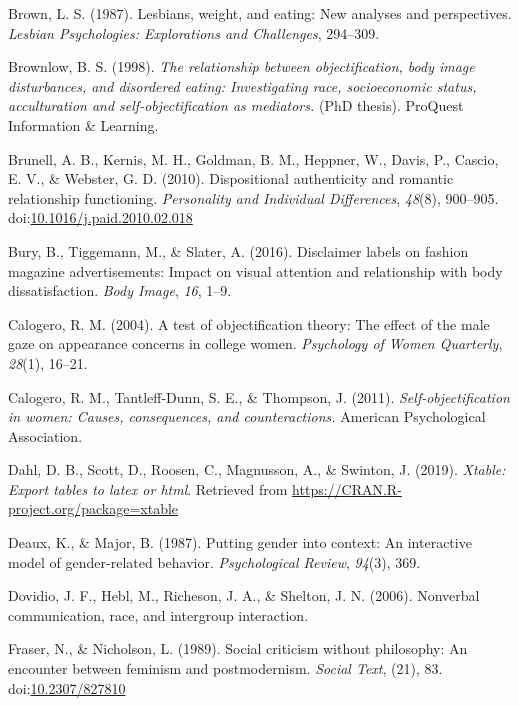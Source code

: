 \documentclass[
  man]{apa6}
\begin{document}
\leavevmode\hypertarget{ref-brown1987lesbians}{}%
Brown, L. S. (1987). Lesbians, weight, and eating: New analyses and perspectives. \emph{Lesbian Psychologies: Explorations and Challenges}, 294--309.

\leavevmode\hypertarget{ref-brownlow1998relationship}{}%
Brownlow, B. S. (1998). \emph{The relationship between objectification, body image disturbances, and disordered eating: Investigating race, socioeconomic status, acculturation and self-objectification as mediators.} (PhD thesis). ProQuest Information \& Learning.

\leavevmode\hypertarget{ref-brunelletal2010}{}%
Brunell, A. B., Kernis, M. H., Goldman, B. M., Heppner, W., Davis, P., Cascio, E. V., \& Webster, G. D. (2010). Dispositional authenticity and romantic relationship functioning. \emph{Personality and Individual Differences}, \emph{48}(8), 900--905. doi:\href{https://doi.org/10.1016/j.paid.2010.02.018}{10.1016/j.paid.2010.02.018}

\leavevmode\hypertarget{ref-bury2016}{}%
Bury, B., Tiggemann, M., \& Slater, A. (2016). Disclaimer labels on fashion magazine advertisements: Impact on visual attention and relationship with body dissatisfaction. \emph{Body Image}, \emph{16}, 1--9.

\leavevmode\hypertarget{ref-calogero2004test}{}%
Calogero, R. M. (2004). A test of objectification theory: The effect of the male gaze on appearance concerns in college women. \emph{Psychology of Women Quarterly}, \emph{28}(1), 16--21.

\leavevmode\hypertarget{ref-calogero2011}{}%
Calogero, R. M., Tantleff-Dunn, S. E., \& Thompson, J. (2011). \emph{Self-objectification in women: Causes, consequences, and counteractions.} American Psychological Association.

\leavevmode\hypertarget{ref-R-xtable}{}%
Dahl, D. B., Scott, D., Roosen, C., Magnusson, A., \& Swinton, J. (2019). \emph{Xtable: Export tables to latex or html}. Retrieved from \url{https://CRAN.R-project.org/package=xtable}

\leavevmode\hypertarget{ref-deaux1987putting}{}%
Deaux, K., \& Major, B. (1987). Putting gender into context: An interactive model of gender-related behavior. \emph{Psychological Review}, \emph{94}(3), 369.

\leavevmode\hypertarget{ref-dovidio2006nonverbal}{}%
Dovidio, J. F., Hebl, M., Richeson, J. A., \& Shelton, J. N. (2006). Nonverbal communication, race, and intergroup interaction.

\leavevmode\hypertarget{ref-frasernicholson1989}{}%
Fraser, N., \& Nicholson, L. (1989). Social criticism without philosophy: An encounter between feminism and postmodernism. \emph{Social Text}, (21), 83. doi:\href{https://doi.org/10.2307/827810}{10.2307/827810}
\end{document}
